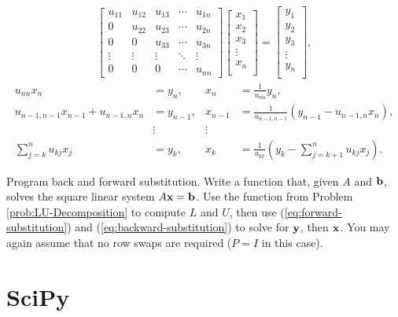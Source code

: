 \begin{align*}
\left[\begin{array}{ccccc}
u_{11} & u_{12} & u_{13} & \cdots & u_{1n} \\
0      & u_{22} & u_{23} & \cdots & u_{2n} \\
0      & 0      & u_{33} & \cdots & u_{3n} \\
\vdots & \vdots & \vdots & \ddots & \vdots \\
0      & 0      & 0      & \cdots & u_{nn}
\end{array}\right]
\left[\begin{array}{c}
x_1 \\ x_2 \\ x_3 \\ \vdots \\ x_n \\
\end{array}\right]
=
\left[\begin{array}{c}
y_1 \\ y_2 \\ y_3 \\ \vdots \\ y_n \\
\end{array}\right],
\end{align*}
\begin{align}
\nonumber u_{nn}x_n &= y_n, & x_n &= \frac{1}{u_{nn}}y_n, \\
\nonumber u_{n-1,n-1}x_{n-1} + u_{n-1,n}x_{n} &= y_{n-1}, & x_{n-1} &= \frac{1}{u_{n-1,n-1}}\left(y_{n-1} - u_{n-1,n}x_{n}\right),\\
\nonumber & \vdots & \vdots & \\
\sum_{j=k}^{n}u_{kj}x_j &= y_k, & x_k &= \frac{1}{u_{kk}}\left(y_k - \sum_{j=k+1}^{n}u_{kj}x_j\right).
\label{eq:backward-substitution}
\end{align}

\begin{problem}{Program back and forward substitution.}
Write a function that, given $A$ and $\mathbf{b}$, solves the square linear system $A\mathbf{x} = \mathbf{b}$.
Use the function from Problem \ref{prob:LU-Decomposition} to compute $L$ and $U$, then use (\ref{eq:forward-substitution}) and (\ref{eq:backward-substitution}) to solve for $\mathbf{y}$, then $\mathbf{x}$.
You may again assume that no row swaps are required ($P = I$ in this case).
\label{prob:substitute-solve}
\end{problem}

\section*{SciPy} %

